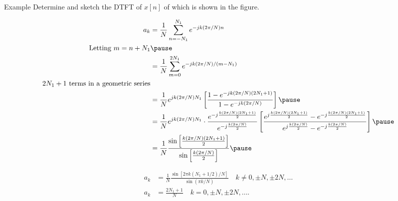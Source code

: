\begin{frame}{Example}
    Determine and sketch the DTFT of $x[n]$ of which is shown in the figure.
    \begin{figure}
        \centering
        
    \end{figure}
    \pause
\end{frame}


\begin{frame}
    {
        \begin{align*}
                a_k &= \frac{1}{N}\sum_{n=-N_1}^{N_1}e^{-jk(2\pi/N)n}\\
                \text{Letting~} m = n+N_1&\pause\\
                &= \frac{1}{N}\sum_{m=0}^{2N_1}e^{-jk(2\pi/N)/(m- N_1)}\\
                2N_1 + 1\text{~terms in a geometric series}&\\
                &= \frac{1}{N}e^{jk(2\pi/N)N_1}\left[\frac{1 - e^{-jk(2\pi/N)(2N_1 + 1)}}{1 - e^{-jk(2\pi/N)}}\right]\pause\\
                &=  \frac{1}{N} e^{jk(2\pi/N)N_1} \cdot
                \frac{
                    e^{-j\frac{k(2\pi/N)(2N_1+1)}{2}}
                }{
                e^{-j\frac{k(2\pi/N)}{2}}
                } \left[
                \frac{e^{j\frac{k(2\pi/N)(2N_1+1)}{2}}  - e^{-j\frac{k(2\pi/N)(2N_1+1)}{2}} }
                {e^{j\frac{k(2\pi/N)}{2}} - e^{-j\frac{k(2\pi/N)}{2}}}\right]\pause\\
                &=  \frac{1}{N} \frac{\sin\left[ \frac{k(2\pi/N)(2N_1+1)}{2} \right]}{\sin\left[\frac{k(2\pi/N)}{2}\right]}\pause\\
        \end{align*}
    }
\end{frame}

\begin{frame}
    {
        \begin{align*}
                a_k &=  \frac{1}{N} \frac{\sin\left[ 2\pi k(N_1+1/2)/N \right]}{\sin(\pi k/N)}\quad k \neq 0, \pm N, \pm 2N, \dots\\
                a_k &= \frac{2N_1+1}{N}\quad k = 0, \pm N, \pm 2N, \dots.
        \end{align*}
    }
\end{frame} 

\begin{frame}
    \begin{figure}
        \centering
        
    \end{figure}
\end{frame}

%

